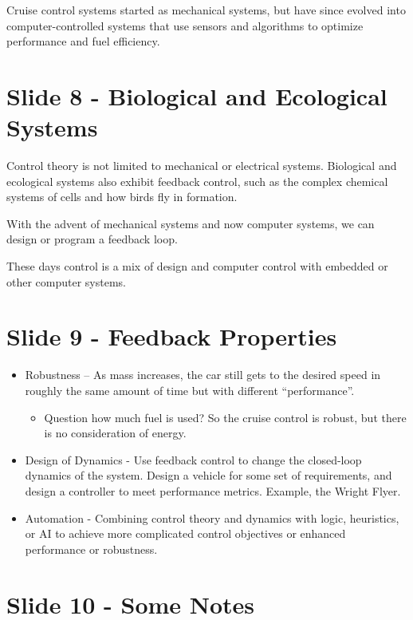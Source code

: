 \documentclass[
  letterpaper,
  DIV=11,
  numbers=noendperiod]{scrreprt}
\providecommand{\tightlist}{%
  \setlength{\itemsep}{0pt}\setlength{\parskip}{0pt}}
\begin{document}
Cruise control systems started as mechanical systems, but have since
evolved into computer-controlled systems that use sensors and algorithms
to optimize performance and fuel efficiency.

\section{Slide 8 - Biological and Ecological
Systems}\label{slide-8---biological-and-ecological-systems}

Control theory is not limited to mechanical or electrical systems.
Biological and ecological systems also exhibit feedback control, such as
the complex chemical systems of cells and how birds fly in formation.

With the advent of mechanical systems and now computer systems, we can
design or program a feedback loop.

These days control is a mix of design and computer control with embedded
or other computer systems.

\section{Slide 9 - Feedback
Properties}\label{slide-9---feedback-properties}

\begin{itemize}
\tightlist
\item
  Robustness -- As mass increases, the car still gets to the desired
  speed in roughly the same amount of time but with different
  ``performance''.

  \begin{itemize}
  \tightlist
  \item
    Question how much fuel is used? So the cruise control is robust, but
    there is no consideration of energy.
  \end{itemize}
\item
  Design of Dynamics - Use feedback control to change the closed-loop
  dynamics of the system. Design a vehicle for some set of requirements,
  and design a controller to meet performance metrics. Example, the
  Wright Flyer.
\item
  Automation - Combining control theory and dynamics with logic,
  heuristics, or AI to achieve more complicated control objectives or
  enhanced performance or robustness.
\end{itemize}

\section{Slide 10 - Some Notes}\label{slide-10---some-notes}
\end{document}
